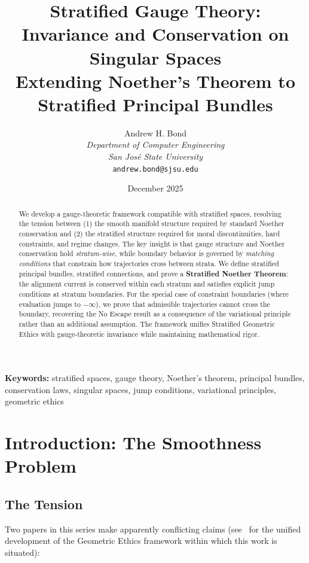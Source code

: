 \documentclass[11pt,a4paper]{article}
\title{\textbf{Stratified Gauge Theory:\\Invariance and Conservation on Singular Spaces}\\[0.5em]
\large Extending Noether's Theorem to Stratified Principal Bundles}
\author{Andrew H. Bond\\
\textit{Department of Computer Engineering}\\
\textit{San Jos\'e State University}\\
\texttt{andrew.bond@sjsu.edu}}
\date{December 2025}
\begin{document}
\maketitle

\begin{abstract}
We develop a gauge-theoretic framework compatible with stratified spaces, resolving the
tension between (1) the smooth manifold structure required by standard Noether conservation and (2) the stratified structure required for moral discontinuities, hard constraints,
and regime changes. The key insight is that gauge structure and Noether conservation hold
\textit{stratum-wise}, while boundary behavior is governed by \textit{matching conditions} that constrain
how trajectories cross between strata. We define stratified principal bundles, stratified
connections, and prove a \textbf{Stratified Noether Theorem}: the alignment current is conserved within each stratum and satisfies explicit jump conditions at stratum boundaries.
For the special case of constraint boundaries (where evaluation jumps to $-\infty$), we prove
that admissible trajectories cannot cross the boundary, recovering the No Escape result as a
consequence of the variational principle rather than an additional assumption. The framework unifies Stratified Geometric Ethics with gauge-theoretic invariance while maintaining
mathematical rigor.
\end{abstract}

\medskip
\noindent\textbf{Keywords:} stratified spaces, gauge theory, Noether's theorem, principal bundles, conservation laws, singular spaces, jump conditions, variational principles, geometric ethics

\tableofcontents

\section{Introduction: The Smoothness Problem}

\subsection{The Tension}

Two papers in this series make apparently conflicting claims (see~\cite{bond2026ge} for the unified development of the Geometric Ethics framework within which this work is situated):
\end{document}
